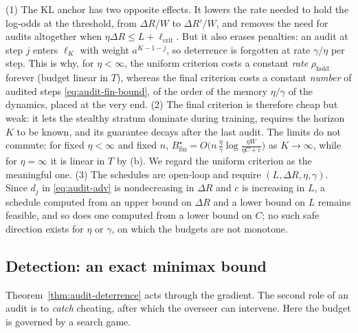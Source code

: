 \begin{remark}\label{rem:audit-criteria}
(1) The KL anchor has two opposite effects. It lowers the rate needed to hold
the log-odds at the threshold, from $\Delta R/W$ to $\Delta R'/W$, and removes
the need for audits altogether when $\eta\Delta R\le L+\ell_{\mathrm{crit}}$.
But it also erases penalties: an audit at step $j$ enters $\ell_K$ with weight
$a^{K-1-j}$, so deterrence is forgotten at rate $\gamma/\eta$ per step. This is
why, for $\eta<\infty$, the uniform criterion costs a constant \emph{rate}
$\rho_{\mathrm{hold}}$ forever (budget linear in $T$), whereas the final
criterion costs a constant \emph{number} of audited steps
\eqref{eq:audit-fin-bound}, of the order of the memory $\eta/\gamma$ of the
dynamics, placed at the very end. (2) The final criterion is therefore cheap
but weak: it lets the stealthy stratum dominate during training, requires the
horizon $K$ to be known, and its guarantee decays after the last audit. The
limits do not commute: for fixed $\eta<\infty$ and fixed $n$, $B^\star_{\mathrm{fin}}=O\bigl(n\,\tfrac{\eta}{\gamma}\log\tfrac{\eta W}{\eta C+c}\bigr)$ as
$K\to\infty$, while for $\eta=\infty$ it is linear in $T$ by (b). We regard the
uniform criterion as the meaningful one. (3) The schedules are open-loop and
require $(L,\Delta R,\eta,\gamma)$. Since $d_j$ in \eqref{eq:audit-adv} is
nondecreasing in $\Delta R$ and $c$ is increasing in $L$, a schedule computed
from an upper bound on $\Delta R$ and a lower bound on $L$ remains feasible, and so does one computed from a lower bound on $C$; no such safe direction exists for $\eta$ or $\gamma$, on which the budgets are not monotone.
\end{remark}

\subsection{Detection: an exact minimax bound}

Theorem~\ref{thm:audit-deterrence} acts through the gradient. The second role
of an audit is to \emph{catch} cheating, after which the overseer can
intervene. Here the budget is governed by a search game.


